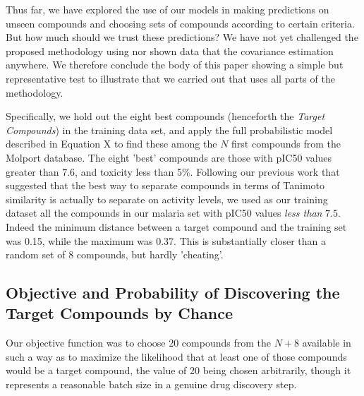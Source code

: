 \documentclass[journal=jacsat,manuscript=article]{achemso}
\begin{document}
Thus far, we have explored the use of our models in making predictions on unseen compounds and choosing sets of compounds according to certain criteria.  But how much should we trust these predictions?  We have not yet challenged the proposed methodology using 
nor shown data that the covariance estimation anywhere.  We therefore conclude the body of this paper showing a simple but representative test to illustrate 
that we carried out that uses all parts of the methodology.


Specifically, we hold out the eight best compounds (henceforth the \textit{Target Compounds}) in the training data set, and apply the full probabilistic model described in Equation X to find these among the $N$ first compounds from the Molport database. 
The eight 'best' compounds 
are those with pIC50 values greater than $7.6$, and toxicity less than 5\%. %
Following our previous work\cite{et1:} that suggested that the best way to separate compounds in terms of Tanimoto similarity is actually to separate on activity levels,
we used as our training dataset all the compounds in our malaria set with pIC50 values \textit{less than} $7.5$.
Indeed the minimum distance between a target compound and the training set was 0.15, while the maximum was 0.37.  This is substantially closer than a random set of 8 compounds, but hardly 'cheating'.


\subsection*{Objective and Probability of Discovering the Target Compounds by Chance}

Our objective function was to choose $20$ compounds from the $N+8$ available in such a way as to maximize the likelihood that at least one of those compounds would be a target compound, the value of 20 being chosen arbitrarily, though it represents a reasonable batch size in a genuine drug discovery step.
\end{document}
